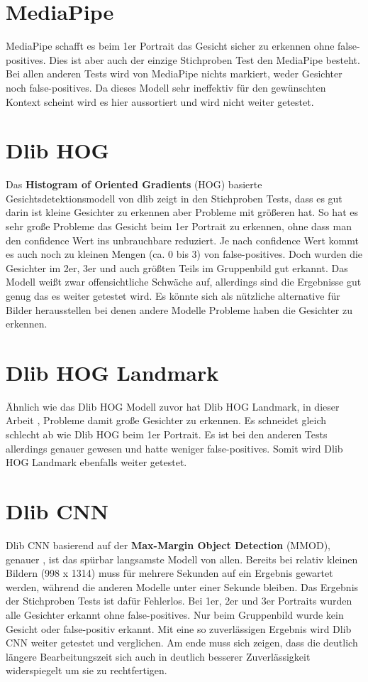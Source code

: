 \section{MediaPipe}
MediaPipe schafft es beim 1er Portrait das Gesicht sicher zu erkennen ohne false-positives. Dies ist aber auch der einzige Stichproben Test den MediaPipe besteht. Bei allen anderen Tests wird von MediaPipe nichts markiert, weder Gesichter noch false-positives. Da dieses Modell sehr ineffektiv für den gewünschten Kontext scheint wird es hier aussortiert und wird nicht weiter getestet.

\section{Dlib HOG}
Das \textbf{Histogram of Oriented Gradients} (HOG) basierte Gesichtsdetektionsmodell von dlib zeigt in den Stichproben Tests, dass es gut darin ist kleine Gesichter zu erkennen aber Probleme mit größeren hat. So hat es sehr große Probleme das Gesicht beim 1er Portrait zu erkennen, ohne dass man den confidence Wert ins unbrauchbare reduziert. Je nach confidence Wert kommt es auch noch zu kleinen Mengen (ca. 0 bis 3) von false-positives. Doch wurden die Gesichter im 2er, 3er und auch größten Teils im Gruppenbild gut erkannt. Das Modell weißt zwar offensichtliche Schwäche auf, allerdings sind die Ergebnisse gut genug das es weiter getestet wird. Es könnte sich als nützliche alternative für Bilder herausstellen bei denen andere Modelle Probleme haben die Gesichter zu erkennen.

\section{Dlib HOG Landmark}
Ähnlich wie das Dlib HOG Modell zuvor hat Dlib HOG Landmark, in dieser Arbeit , Probleme damit große Gesichter zu erkennen. Es schneidet gleich schlecht ab wie Dlib HOG beim 1er Portrait. Es ist bei den anderen Tests allerdings genauer gewesen und hatte weniger false-positives. Somit wird Dlib HOG Landmark ebenfalls weiter getestet.

\section{Dlib CNN}
Dlib CNN basierend auf der \textbf{Max-Margin Object Detection} (MMOD), genauer , ist das spürbar langsamste Modell von allen. Bereits bei relativ kleinen Bildern (998 x 1314) muss für mehrere Sekunden auf ein Ergebnis gewartet werden, während die anderen Modelle unter einer Sekunde bleiben. Das Ergebnis der Stichproben Tests ist dafür Fehlerlos. Bei 1er, 2er und 3er Portraits wurden alle Gesichter erkannt ohne false-positives. Nur beim Gruppenbild wurde kein Gesicht oder false-positiv erkannt. Mit eine so zuverlässigen Ergebnis wird Dlib CNN weiter getestet und verglichen. Am ende muss sich zeigen, dass die deutlich längere Bearbeitungszeit sich auch in deutlich besserer Zuverlässigkeit widerspiegelt um sie zu rechtfertigen.

